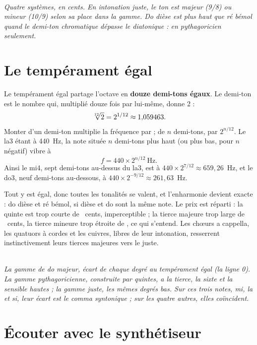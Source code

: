 \documentclass[a4paper,11pt]{article}
\newcommand{\legende}[1]{\\[4pt]{\small\itshape\color{mygray} #1}}
\begin{document}
\begin{center}

\legende{Quatre systèmes, en cents. En intonation juste, le ton est majeur
(9/8) ou mineur (10/9) selon sa place dans la gamme. Do dièse est plus haut
que ré bémol quand le demi-ton chromatique dépasse le diatonique : en
pythagoricien seulement.}
\end{center}

\section{Le tempérament égal}
\label{sec:egal}

Le tempérament égal partage l'octave en \textbf{douze demi-tons égaux}. Le
demi-ton est le nombre qui, multiplié douze fois par lui-même, donne 2 :
\[
  \sqrt[12]{2} = 2^{1/12} \approx 1{,}059463 .
\]
Monter d'un demi-ton multiplie la fréquence par \demiTon ; de $n$ demi-tons,
par $2^{n/12}$. Le la3 étant à 440~Hz, la note située $n$ demi-tons plus haut
(ou plus bas, pour $n$ négatif) vibre à
\[
  f = 440 \times 2^{n/12}~\text{Hz}.
\]
Ainsi le mi4, sept demi-tons au-dessus du la3, est à
$440 \times 2^{7/12} \approx 659{,}26$~Hz, et le do3, neuf demi-tons
au-dessous, à $440 \times 2^{-9/12} \approx 261{,}63$~Hz.

Tout y est égal, donc toutes les tonalités se valent, et l'enharmonie devient
exacte : do dièse et ré bémol, si dièse et do sont la même note. Le prix est
réparti : la quinte est trop courte de \ecartQuinte~cents, imperceptible ; la
tierce majeure trop large de \ecartTierce~cents, la tierce mineure trop étroite
de \ecartTierceMin, ce qui s'entend. Les chœurs a cappella, les quatuors à
cordes et les cuivres, libres de leur intonation, resserrent instinctivement
leurs tierces majeures vers le juste.

\begin{center}

\legende{La gamme de do majeur, écart de chaque degré au tempérament égal (la
ligne 0). La gamme pythagoricienne, construite par quintes, a la tierce, la
sixte et la sensible hautes ; la gamme juste, les mêmes degrés bas. Sur ces
trois notes, mi, la et si, leur écart est le comma syntonique ; sur les quatre
autres, elles coïncident.}
\end{center}

\section{Écouter avec le synthétiseur}
\label{sec:synth}
\end{document}
